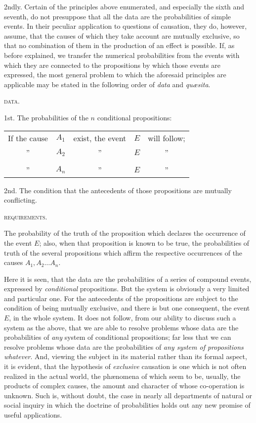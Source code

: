 \documentclass[oneside]{book}
\begin{document}
2ndly. Certain of the principles above enumerated, and especially
the sixth and seventh, do not presuppose that all the data
are the probabilities of simple events. In their peculiar application
to questions of causation, they do, however, assume, that the
causes of which they take account are mutually exclusive, so
that no combination of them in the production of an effect is
possible. If, as before explained, we transfer the numerical probabilities
from the events with which they are connected to the
propositions by which those events are expressed, the most general
problem to which the aforesaid principles are applicable
may be stated in the following order of \emph{data} and \emph{qu{\ae}sita}.


\begin{center}\textsc{data}.\end{center}

1st. The probabilities of the $n$ conditional propositions:

\begin{tabular}{ccccc}
If the cause &$A_1$& exist, the event &$E$& will follow;\\
      ''     &$A_2$&        ''        &$E$&      ''     \\
\multicolumn{5}{c}{\dotfill}\\
      ''     &$A_n$&        ''        &$E$&      ''
\end{tabular}

2nd. The condition that the antecedents of those propositions
are mutually conflicting.

\begin{center}\textsc{requirements}.\end{center}

The probability of the truth of the proposition which declares
the occurrence of the event $E$; also, when that proposition is
known to be true, the probabilities of truth of the several propositions which affirm the respective occurrences of the causes
$A_1, A_2 \dotsc A_n$.

Here it is seen, that the data are the probabilities of a series
of compound events, expressed by \emph{conditional} propositions. But
the system is obviously a very limited and particular one. For
the antecedents of the propositions are subject to the condition of
being mutually exclusive, and there is but one consequent, the
event $E$, in the whole system. It does not follow, from our
ability to discuss such a system as the above, that we are able to
resolve problems whose data are the probabilities of \emph{any} system
of conditional propositions; far less that we can resolve problems
whose data are the probabilities of \emph{any system of propositions
whatever}. And, viewing the subject in its material rather
than its formal aspect, it is evident, that the hypothesis of \emph{exclusive}
causation is one which is not often realized in the actual
world, the ph{\ae}nomena of which seem to be, usually, the products
of complex causes, the amount and character of whose co-operation
is unknown. Such is, without doubt, the case in nearly all
departments of natural or social inquiry in which the doctrine of
probabilities holds out any new promise of useful applications.
\end{document}
